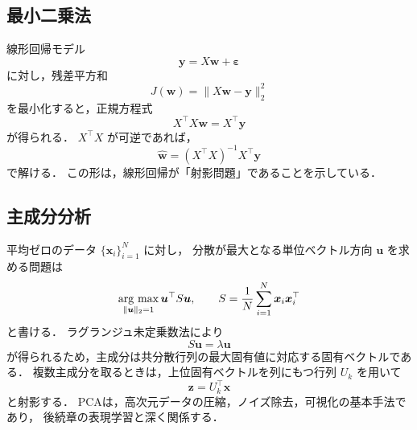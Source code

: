 \subsection{最小二乗法}

線形回帰モデル
\begin{equation}
  \boldsymbol{y} = X\boldsymbol{w} + \boldsymbol{\varepsilon}
  \label{eq:linear-regression}
\end{equation}
に対し，残差平方和
\begin{equation}
  J(\boldsymbol{w})
  =
  \|X\boldsymbol{w}-\boldsymbol{y}\|_{2}^{2}
  \label{eq:least-squares-objective}
\end{equation}
を最小化すると，正規方程式
\begin{equation}
  X^{\top}X\boldsymbol{w} = X^{\top}\boldsymbol{y}
  \label{eq:normal-equation}
\end{equation}
が得られる．
$X^{\top}X$ が可逆であれば，
\begin{equation}
  \hat{\boldsymbol{w}}
  =
  (X^{\top}X)^{-1}X^{\top}\boldsymbol{y}
  \label{eq:ols}
\end{equation}
で解ける．
この形は，線形回帰が「射影問題」であることを示している．

\subsection{主成分分析}

平均ゼロのデータ $\{\boldsymbol{x}_{i}\}_{i=1}^{N}$ に対し，
分散が最大となる単位ベクトル方向 $\boldsymbol{u}$ を求める問題は
\begin{equation}
  \mathop{\rm arg~max}\limits_{\|\boldsymbol{u}\|_{2}=1}
  \boldsymbol{u}^{\top}S\boldsymbol{u},
  \qquad
  S = \frac{1}{N}\sum_{i=1}^{N}\boldsymbol{x}_{i}\boldsymbol{x}_{i}^{\top}
  \label{eq:pca-objective}
\end{equation}
と書ける\cite{Pearson1901}．
ラグランジュ未定乗数法により
\begin{equation}
  S\boldsymbol{u} = \lambda \boldsymbol{u}
  \label{eq:pca-eigenproblem}
\end{equation}
が得られるため，主成分は共分散行列の最大固有値に対応する固有ベクトルである．
複数主成分を取るときは，上位固有ベクトルを列にもつ行列 $U_{k}$ を用いて
\begin{equation}
  \boldsymbol{z} = U_{k}^{\top}\boldsymbol{x}
  \label{eq:pca-projection}
\end{equation}
と射影する．
PCAは，高次元データの圧縮，ノイズ除去，可視化の基本手法であり，
後続章の表現学習と深く関係する．

